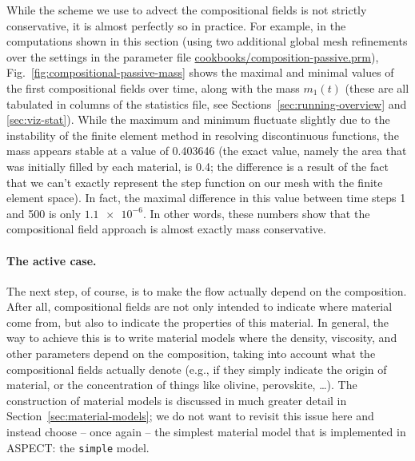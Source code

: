 \documentclass{article}
\newcommand{\aspect}{\textsc{ASPECT}}
\begin{document}
While the scheme we use to advect the compositional fields is not strictly
conservative, it is almost perfectly so in practice. For example, in
the computations shown in this section (using two additional global mesh
refinements over the settings in the parameter file
\url{cookbooks/composition-passive.prm}), Fig.~\ref{fig:compositional-passive-mass}
shows the maximal and minimal values of the first compositional fields over time,
along with the mass $m_1(t)$ (these are all tabulated in columns of the
statistics file, see Sections~\ref{sec:running-overview} and \ref{sec:viz-stat}). While
the maximum and minimum fluctuate slightly due to the instability of the finite element
method in resolving discontinuous functions,
the mass appears stable at a value of 0.403646 (the exact value, namely the
area that was initially filled by each material, is 0.4; the difference is a
result of the fact that we can't exactly represent the step function on our
mesh with the finite element space). In fact, the maximal difference in this
value between time steps 1 and 500 is only $\num{1.1e-6}$. In other words,
these numbers show that the compositional field approach is almost exactly mass conservative.


\paragraph{The active case.} The next step, of course, is to make the flow
actually depend on the composition. After all, compositional fields are not only
intended to indicate where material come from, but also to indicate the
properties of this material. In general, the way to achieve this is to write
material models where the density, viscosity, and other parameters depend on the
composition, taking into account what the compositional fields actually denote
(e.g., if they simply indicate the origin of material, or the concentration of
things like olivine, perovskite, \ldots). The construction of material models is
discussed in much greater detail in Section~\ref{sec:material-models}; we do not
want to revisit this issue here and instead choose -- once again -- the simplest
material model that is implemented in \aspect{}: the \texttt{simple} model.
\end{document}
